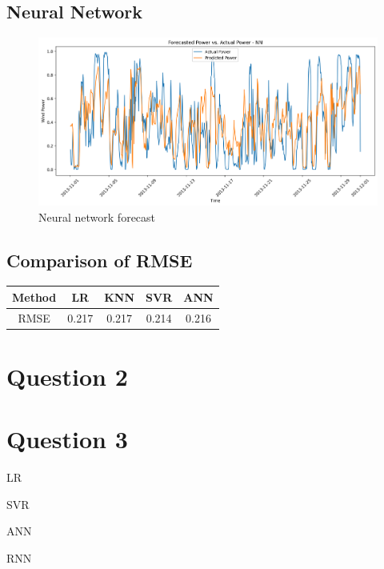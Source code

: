 \documentclass[a4paper, article, oneside, USenglish, IN5460]{memoir}
\begin{document}
\section{Neural Network}
\begin{figure}[H]
    \centering
    \includegraphics[width=1\linewidth]{fig/q1-NN-forecast.png}
    \caption{Neural network forecast}
    \label{fig:q1-LR-forecast}
\end{figure}

\section{Comparison of RMSE}

\begin{table}[H]
    \centering
    \begin{tabular}{|c|c|c|c|c|} \hline 
        Method & LR & KNN & SVR & ANN\\ \hline 
        RMSE&  0.217&  0.217&  0.214& 0.216\\ \hline
    \end{tabular}
    \label{tab:q1-RMSE-comparison}
\end{table}


\chapter{Question 2}

\chapter{Question 3}

LR

SVR

ANN

RNN
\end{document}
